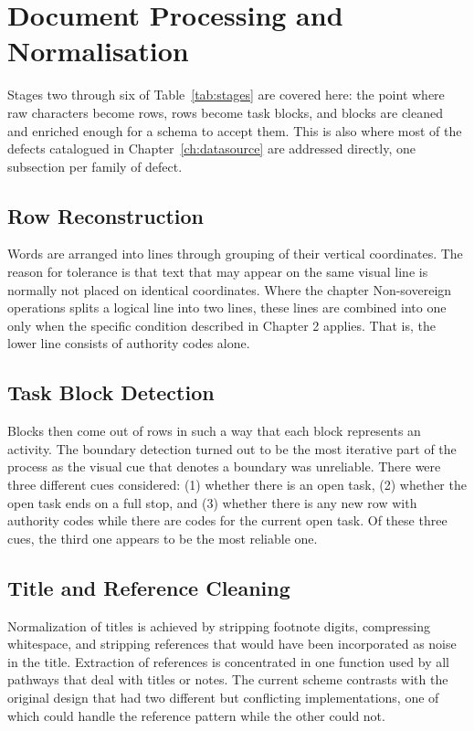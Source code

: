 \section{Document Processing and Normalisation}

Stages two through six of Table~\ref{tab:stages} are covered here: the point where raw
characters become rows, rows become task blocks, and blocks are cleaned and enriched enough
for a schema to accept them. This is also where most of the defects catalogued in
Chapter~\ref{ch:datasource} are addressed directly, one subsection per family of defect.

\subsection{Row Reconstruction}

Words are arranged into lines through grouping of their vertical coordinates. The reason for tolerance is that text that may appear on the same visual line is normally not placed on identical coordinates. Where the chapter Non-sovereign operations splits a logical line into two lines, these lines are combined into one only when the specific condition described in Chapter 2 applies. That is, the lower line consists of authority codes alone.

\subsection{Task Block Detection}

Blocks then come out of rows in such a way that each block represents an activity. The boundary detection turned out to be the most iterative part of the process as the visual cue that denotes a boundary was unreliable. There were three different cues considered: (1) whether there is an open task, (2) whether the open task ends on a full stop, and (3) whether there is any new row with authority codes while there are codes for the current open task. Of these three cues, the third one appears to be the most reliable one.

\subsection{Title and Reference Cleaning}

Normalization of titles is achieved by stripping footnote digits, compressing whitespace, and stripping references that would have been incorporated as noise in the title. Extraction of references is concentrated in one function used by all pathways that deal with titles or notes. The current scheme contrasts with the original design that had two different but conflicting implementations, one of which could handle the reference pattern while the other could not.

